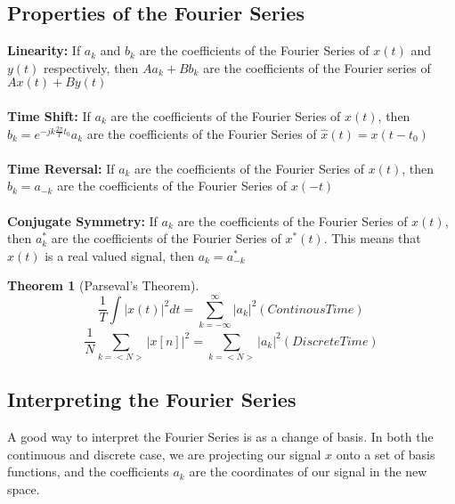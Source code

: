 \documentclass{article}
\newtheorem{theorem}{Theorem}
\begin{document}
\subsection{Properties of the Fourier Series}
\textbf{Linearity: }
If $a_k$ and $b_k$ are the coefficients of the Fourier Series of $x(t)$ and $y(t)$ respectively, then
$Aa_k + Bb_k$ are the coefficients of the Fourier series of $Ax(t)+By(t)$\\\\
\textbf{Time Shift: }
If $a_k$ are the coefficients of the Fourier Series of $x(t)$,
then $b_k = e^{-jk\frac{2\pi}{T}t_0}a_k$ are the coefficients of the Fourier Series of $\hat{x}(t)=x(t-t_0)$\\\\
\textbf{Time Reversal: }
If $a_k$ are the coefficients of the Fourier Series of $x(t)$,
then $b_k=a_{-k}$ are the coefficients of the Fourier Series of $x(-t)$\\\\
\textbf{Conjugate Symmetry: }
If $a_k$ are the coefficients of the Fourier Series of $x(t)$,
then $a_k^*$ are the coefficients of the Fourier Series of $x^*(t)$. 
This means that $x(t)$ is a real valued signal, then $a_k=a_{-k}^*$
\begin{theorem}[Parseval's Theorem]
    \begin{equation*}
        \frac{1}{T}\int{|x(t)|^2dt} = \sum_{k=-\infty}^{\infty}{|a_k|^2} (Continous Time)
    \end{equation*}
    \begin{equation*}
        \frac{1}{N}\sum_{k=<N>}{|x[n]|^2} = \sum_{k=<N>}{|a_k|^2} (Discrete Time)
    \end{equation*}
\end{theorem}
\subsection{Interpreting the Fourier Series}
A good way to interpret the Fourier Series is as a change of basis. In both the continuous and discrete case,
we are projecting our signal $x$ onto a set of basis functions, and the coefficients $a_k$ are the coordinates
of our signal in the new space.
\end{document}
